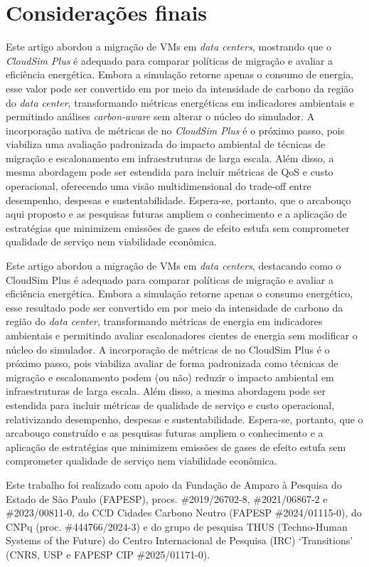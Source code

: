 \documentclass[12pt]{article}
\begin{document}
\section{Considerações finais}
Este artigo abordou a migração de VMs em \textit{data centers}, mostrando que o \textit{CloudSim Plus} é adequado para comparar políticas de migração e avaliar a eficiência energética. Embora a simulação retorne apenas o consumo de energia, esse valor pode ser convertido em  por meio da intensidade de carbono da região do \textit{data center}, transformando métricas energéticas em indicadores ambientais e permitindo análises \emph{carbon-aware} sem alterar o núcleo do simulador. A incorporação nativa de métricas de  no \textit{CloudSim Plus} é o próximo passo, pois viabiliza uma avaliação padronizada do impacto ambiental de técnicas de migração e escalonamento em infraestruturas de larga escala. Além disso, a mesma abordagem pode ser estendida para incluir métricas de QoS e custo operacional, oferecendo uma visão multidimensional do trade-off entre desempenho, despesas e sustentabilidade. Espera-se, portanto, que o arcabouço aqui proposto e as pesquisas futuras ampliem o conhecimento e a aplicação de estratégias que minimizem emissões de gases de efeito estufa sem comprometer qualidade de serviço nem viabilidade econômica.

Este artigo abordou a migração de VMs em \textit{data centers}, destacando como o CloudSim Plus é adequado para comparar políticas de migração e avaliar a eficiência energética. Embora a simulação retorne apenas o consumo energético, esse resultado pode ser convertido em  por meio da intensidade de carbono da região do \textit{data center}, transformando métricas de energia em indicadores ambientais e permitindo avaliar escalonadores cientes de energia sem modificar o núcleo do simulador. A incorporação de métricas de  no CloudSim Plus é o próximo passo, pois viabiliza avaliar de forma padronizada como técnicas de migração e escalonamento podem (ou não) reduzir o impacto ambiental em infraestruturas de larga escala. Além disso, a mesma abordagem pode ser estendida para incluir métricas de qualidade de serviço e custo operacional, relativizando desempenho, despesas e sustentabilidade. Espera-se, portanto, que o arcabouço construído e as pesquisas futuras ampliem o conhecimento e a aplicação de estratégias que minimizem emissões de gases de efeito estufa sem comprometer qualidade de serviço nem viabilidade econômica.

Este trabalho foi realizado com apoio da Fundação de Amparo à Pesquisa do Estado de São Paulo (FAPESP), procs. \mbox{\#2019/26702-8}, \mbox{\#2021/06867-2} e \mbox{\#2023/00811-0}, do CCD Cidades Carbono Neutro (FAPESP \mbox{\#2024/01115-0}), do CNPq (proc. \mbox{\#444766/2024-3}) e do grupo de pesquisa THUS (Techno-Human Systems of the Future) do Centro Internacional de Pesquisa (IRC) `Transitions' (CNRS, USP e FAPESP CIP \mbox{\#2025/01171-0}).

\renewcommand{\refname}{Referências}


\end{document}
